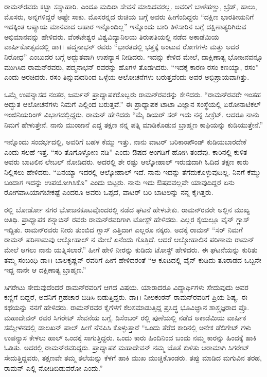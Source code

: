 ರಾಮನ್‍ರವರು ಕಟ್ಟಾ ಸಸ್ಯಾಹಾರಿ. ಎಂದೂ ಮದಿರಾ ಸೇವನೆ ಮಾಡಿದವರಲ್ಲ. ಅವರಿಗೆ ಬಾಳೆಹಣ್ಣು, ಬ್ರೆಡ್, ಹಾಲು, ಮೊಸರು, ಅನ್ನಗಳಿದ್ದರೆ ಅಷ್ಟೇ ಸಾಕು. ಮೊಸರನ್ನದ ರುಚಿಯ ಬಗ್ಗೆ ಅವರು ಹೀಗೆಂದಿದ್ದರು\enginline{-} “ದಕ್ಷಿಣ ಭಾರತೀಯನಿಗೆ ಇದಕ್ಕಿಂತ ಆಪ್ಯಾಯ ಮಾನವಾದ ಆಹಾರ ಇನ್ನೊಂದಿಲ್ಲ” ಇನ್ನೊಂದು ಬಾರಿ ತಿಳಿಸಾರಿನ ಬಗ್ಗೆ ದಕ್ಷಿಣಾತ್ಯರಿಗಿರುವ ಅಭಿಮಾನವನ್ನು ಹೇಳಿದರು. ವೆಂಕಟೇಶ್ವರ ವಿಶ್ವವಿದ್ಯಾನಿಲಯ ತಿರುಪತಿಯಲ್ಲಿ ನಡೆದ ಅಕಾಡೆಮಿಯ ವಾರ್ಷಿಕೋತ್ಸವದಲ್ಲಿ ಡಾ।। ಪದ್ಮನಾಭನ್ ರವರು “ಭಾರತದಲ್ಲಿ ಭತ್ತಕ್ಕೆ ಅಂಟುವ ರೋಗಗಳು ಮತ್ತು ಅದರ ನಿರೋಧ” \textit{} ಎಂಬುದರ ಬಗ್ಗೆ ಅದ್ಭುತವಾಗಿ ಉಪನ್ಯಾಸ ನೀಡಿದರು. ಇದನ್ನು ಕೇಳಿದ ಮೇಲೆ, ದಾಕ್ಷಿಣಾತ್ಯ ಭೋಜನವನ್ನೂ ಮುಗಿಸಿದ ರಾಮನ್‍ರವರು, ಪದ್ಮನಾಭನ್ ರವರನ್ನು ಹೊಗಳ ತೊಡಗಿದರು. “ಇದಕ್ಕೆ ಕಾರಣ ರಸಂ ಕಣಯ್ಯಾ, ರಸಂ” ಎಂದು ಅರಚಿದರು. ರಸಂ ತಿನ್ನುವುದರಿಂದ ಒಳ್ಳೆಯ ಆಲೋಚನೆಗಳು ಬರುತ್ತವೆಂದು ಅವರ ಅಭಿಪ್ರಾಯವಾಗಿತ್ತು.

ಒಮ್ಮೆ ಉಪನ್ಯಾಸದ ನಂತರ, ಜರ್ಮನ್ ಪ್ರಾಧ್ಯಾಪಕರೊಬ್ಬರು ರಾಮನ್‍ರವರನ್ನು ಕೇಳಿದರು. “ರಾಮನ್‍ರವರೇ ಇಂತಹ ಅದ್ಭುತ ಆಲೋಚನೆಗಳು ನಿಮಗೆ ಎಲ್ಲಿಂದ ಬರುತ್ತವೆ.” ಈ ಪ್ರಾಧ್ಯಾಪಕ ಟಾಟಾ ವಿಜ್ಞಾನ ಸಂಸ್ಥೆಯಲ್ಲಿ ಏರೋನಾಟಿಕಲ್ ಇಂಜಿನಿಯರಿಂಗ್ ವಿಭಾಗದಲ್ಲಿದ್ದರು. ರಾಮನ್ ಹೇಳಿದರು\enginline{-} “ಮೈ ಡಿಯರ್ ಸರ್ ಇದು ನನ್ನ ಸೀಕ್ರೆಟ್. ಆದರೂ ನಾನು ನಿಮಗೆ ಹೇಳುತ್ತೇನೆ. ನಾನು ಮುಂಜಾನೆ ಎದ್ದ ತಕ್ಷಣ ನನ್ನ ಪತ್ನಿ ಮಾಡಿಕೊಡುವ ಬ್ರಾಹ್ಮಣ ಕಾಫಿಯನ್ನು ಕುಡಿಯುತ್ತೇನೆ.” 

ಇನ್ನೊಂದು ಸಂದರ್ಭದಲ್ಲಿ, ಅವರಿಗೆ ಬಹಳ ಕೆಮ್ಮು ಇತ್ತು. ನಾನು ವಾಟರ್ ಬರಿಕಾಂಪೌಂಡ್ ಕುಡಿಯಬಾರದೇಕೆ ಎಂದು ಸಲಹೆ ಇತ್ತೆ. “ಸರಿ ತೊಗೊಳ್ಳೋಣ ನಡಿ” ಎಂದು ಔಷದ ಅಂಗಡಿಗೆ ಹೋಗಿ ತಂದೆವು. ಕಾರಿನಲ್ಲಿ ಕುಳಿತ ಅವರು ಬಾಟಲಿನ ಲೇಬಲ್ ನೋಡಿದರು. ಅದರಲ್ಲಿ ಶೇ  ರಷ್ಟು ಆಲ್ಕೋಹಾಲ್ ಇರುವುದಾಗಿ ಓದಿದ ತಕ್ಷಣ ಕಾರು ನಿಲ್ಲಿಸಲು ಹೇಳಿದರು. “ಏನಯ್ಯಾ ಇದರಲ್ಲಿ ಆಲ್ಕೋಹಾಲ್ ಇದೆ. ನಾನು ಇದನ್ನು ತೆಗೆದುಕೊಳ್ಳುವುದಿಲ್ಲ. ನಿನಗೆ ಕೆಮ್ಮು ಬಂದಾಗ ಇದನ್ನು ಉಪಯೋಗಿಸಿಕೊ” ಎಂದು ಬಿಟ್ಟರು. ನಾನು ಇದು ಔಷದವಲ್ಲವೇ ಯಾವುದಿದ್ದರೆ ಏನು ರೋಗವಾಸಿಯಾಗಬೇಕಷ್ಟೆ ಎಂದರೂ ಅವರು ಒಪ್ಪದೆ, ವಾಟರ್ ಬರಿ ಬಾಟಲನ್ನು ನನ್ನ ಕೈಗಿತ್ತರು.

ರಲ್ಲಿ ಬೋರ್ಡೋ ನಗರ ಭೋಜನಕೂಟವೊಂದರಲ್ಲಿ ನಡೆದ ಘಟನೆ ಹೇಳಬೇಕು. ರಾಮನ್‍ರವರೇ ಅಲ್ಲಿನ ಮುಖ್ಯ ಅತಿಥಿ. ಪ್ರಾಧ್ಯಾಪಕ ಕನ್ನಾಬಿನ್ ರವರು ರಾಮನ್‍ರವರಿಗಾಗಿ ಟೋಸ್ಟ್ ಹೇಳಿದರು. ಎಲ್ಲರ ಕೈಯಲ್ಲೂ ವೈನ್ ಗ್ಲಾಸ್ ಇದ್ದಿತು. ರಾಮನ್‍ರವರು ನೀರು ತುಂಬಿದ ಗ್ಲಾಸ್ ಎತ್ತಿದಾಗ ಎಲ್ಲರೂ ನಕ್ಕರು. ಅದಕ್ಕೆ ರಾಮನ್ \enginline{-}“ಸರ್ ನಿಮಗೆ ರಾಮನ್ ಪರಿಣಾಮವು ಆಲ್ಕೋಹಾಲ್ ನ ಮೇಲೆ ಏನೆಂದು ಗೊತ್ತಿದೆ. ಆದರೆ ಆಲ್ಕೋಹಾಲಿನ ಪರಿಣಾಮ ರಾಮನ್ ಮೇಲೆ ಆಗಲು ನಾನು ಯತ್ನಿಸಲಾರೆ.” ಹೀಗೆ ಹೇಳಿ ನೀರನ್ನು ಕುಡಿದು ಟೋಸ್ಟ್ ಹೇಳಿದರು. ಈ ಘಟನೆಯನ್ನು ಕುರಿತು ತಮ್ಮ ಸಂಬಂಧಿ ಡಾ।। ಬಾಲಕೃಷ್ಣನ್ ರವರಿಗೆ ಹೀಗೆ ಹೇಳಿದರಂತೆ\enginline{-} “ಆ ಕೂಟದಲ್ಲಿ ವೈನ್ ಕುಡಿದು ತೂರಾಡದ ಒಬ್ಬನೇ ಇದ್ದ\enginline{-} ನಾನೇ ಆ ದಕ್ಷಿಣಾತ್ಯ ಬ್ರಾಹ್ಮಣ.”

ಸಿಗರೇಟು ಸೇದುವುದೆಂದರೆ ರಾಮನ್‍ರವರಿಗೆ ಆಗದ ವಿಷಯ. ಯಾರಾದರೂ ವಿದ್ಯಾರ್ಥಿಗಳು ಸೇದುವುದು ಅವರ ಕಣ್ಣಿಗೆ ಬಿದ್ದರೆ, ಅವನಿಗೆ ಗ್ರಹಚಾರ ಬಿಡಿಸಿ ಬಿಡುತ್ತಿದ್ದರು. ಡಾ।। ನೀಲಕಂಠನ್ ರಾಮನ್‍ರವರಿಗೆ ಪ್ರಿಯ ಶಿಷ್ಯ. ಈ ಕಥೆಯನ್ನು ನನಗೆ ಹೇಳಿದರು. ರಾಮನ್‍ರವರ ಕೈಗೆಳಗೆ ಕೆಲಸಮಾಡುತ್ತಿದ್ದ ಪ್ರಸಿದ್ಧ ಭೂವಿಜ್ಞಾನ ಶಾಸ್ತ್ರಜ್ಞರಾದ ಪ್ರೊ. ಮಹಾದೇವನ್ ರವರ ಸಿಗರೇಟ್ ಸೇವನೆಯ ಬಗ್ಗೆ. ಡಿಸೆಂಬರ್ ರಲ್ಲಿ ಪುಣೆಯಲ್ಲಿ ನಡೆದ ಅಕಾಡೆಮಿಯ ವಾರ್ಷಿಕ ಸಮ್ಮೇಳನದಲ್ಲಿ ಡಾಲಖನ್ ಪಾಲ್ ಹೀಗೆ ನೆನಪಿಸಿ ಕೊಳ್ಳುತ್ತಾರೆ\enginline{-} “ಒಂದು ತೆರೆದ ಕಾರಿನಲ್ಲಿ ಅನೇಕ ಡೆಲಿಗೇಟ್ ಗಳು ಉಪನ್ಯಾಸ ಕೇಳಲು ಹಾಲ್ ಒಂದಕ್ಕೆ ಸಾಗುತ್ತಿದ್ದರು. ಒಂದು ಕಾರು ಹಿಂದಿನಿಂದ ಬಂದು ನಮ್ಮ ಕಾರನ್ನು ಹಿಂದಕ್ಕೆ ಹಾಕಿ ಓಡಿತು. ಅದರಲ್ಲಿ ರಾಮನ್‍ರವರಿದ್ದರು. ಪ್ರಾಧ್ಯಾಪಕ ಮಹಾದೇವನ್ ನಮ್ಮ ಜೊತೆ ಕುಳಿತು ಆರಾಮಾಗಿ ಸಿಗರೇಟ್ ಸೇದುತ್ತಿದ್ದವರು, ತಕ್ಷಣವೇ ತಮ್ಮ ತಲೆಯನ್ನು ಕೆಳಗೆ ಹಾಕಿ ಮುಖ ಮುಚ್ಚಿಕೊಂಡರು. ತಪ್ಪು ಮಾಡಿದ ಮಗುವಿನ ತರಹ, ರಾಮನ್ ಎಲ್ಲಿ ನೋಡಿಬಿಡುವರೋ ಎಂದು.”

